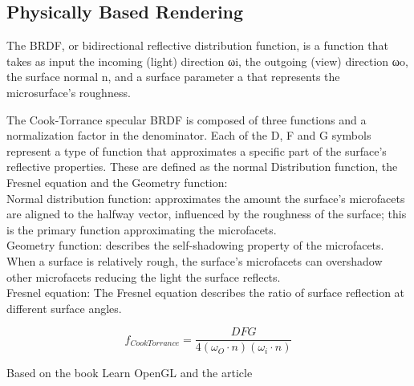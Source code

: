 \newpage
\subsection{Physically Based Rendering}
The BRDF, or bidirectional reflective distribution function, is a function that takes as input the incoming (light) direction ωi, the outgoing (view) direction ωo, the surface normal n, and a surface parameter a that represents the microsurface's roughness.

The Cook-Torrance specular BRDF is composed of three functions and a normalization factor in the denominator. Each of the D, F and G symbols represent a type of function that approximates a specific part of the surface's reflective properties. These are defined as the normal Distribution function, the Fresnel equation and the Geometry function:\\
Normal distribution function: approximates the amount the surface's microfacets are aligned to the halfway vector, influenced by the roughness of the surface; this is the primary function approximating the microfacets.\\
Geometry function: describes the self-shadowing property of the microfacets. When a surface is relatively rough, the surface's microfacets can overshadow other microfacets reducing the light the surface reflects.\\
Fresnel equation: The Fresnel equation describes the ratio of surface reflection at different surface angles.

\[
f_{CookTorrance}=\frac{DFG}{4(\omega_{O} \cdot n)(\omega_{i} \cdot n)}
\]

Based on the book Learn OpenGL \cite{learnopengl} and the article \cite{pbrreferences}